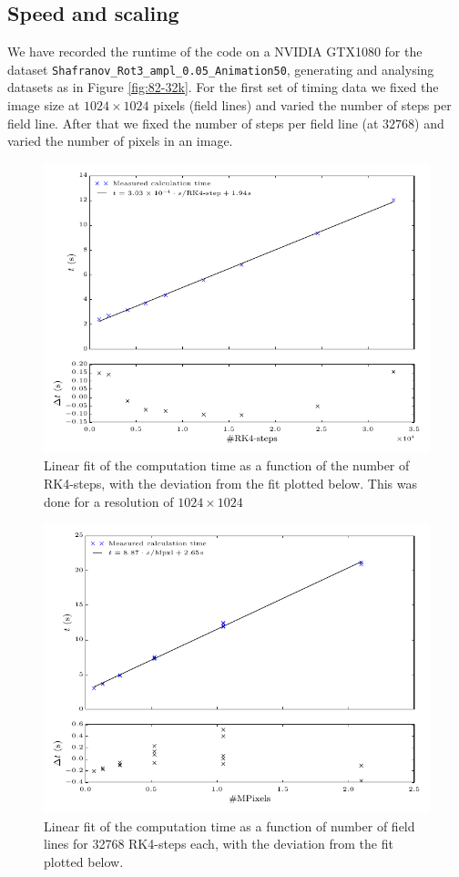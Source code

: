 \documentclass[a4paper]{article}
\begin{document}
\subsection{Speed and scaling}
We have recorded the runtime of the code on a NVIDIA GTX1080 for the dataset \texttt{Shafranov\_Rot3\_ampl\_0.05\_Animation50}, generating and analysing datasets as in Figure \ref{fig:82-32k}. For the first set of timing data we fixed the image size at $1024\times 1024$ pixels (field lines) and varied the number of steps per field line. After that we fixed the number of steps per field line (at $32768$) and varied the number of pixels in an image.\\
\begin{figure}[!ht]
	\includegraphics{Figures/timings_1.pdf}
	\caption{Linear fit of the computation time as a function of the number of RK4-steps, with the deviation from the fit plotted below. This was done for a resolution of $1024 \times 1024$}\label{fig:timings1}
\end{figure}
\begin{figure}[!ht]
	\includegraphics{Figures/timings_2.pdf}
	\caption{Linear fit of the computation time as a function of number of field lines for 32768 RK4-steps each, with the deviation from the fit plotted below.}\label{fig:timings2}
\end{figure}
\end{document}

